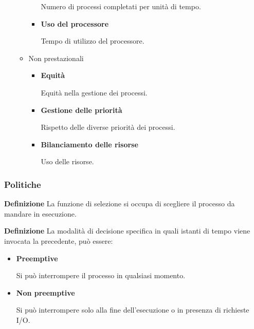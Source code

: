 \documentclass{article}
\begin{document}
\begin{itemize}
\begin{itemize}
\begin{itemize}
                        Numero di processi completati per unità di tempo.
                    
                    \item \textbf{Uso del processore}

                        Tempo di utilizzo del processore.

                    
                \end{itemize}
            
            \item Non prestazionali

                \begin{itemize}
                    \item \textbf{Equità}

                        Equità nella gestione dei processi.
                    
                    \item \textbf{Gestione delle priorità}

                        Rispetto delle diverse priorità dei processi.
                            
                    \item \textbf{Bilanciamento delle risorse}

                        Uso delle risorse.\newline
                    
                \end{itemize}
            
        \end{itemize}
    
\end{itemize}

\newpage

\subsubsection{Politiche}

\textbf{Definizione} La funzione di selezione si occupa di scegliere il processo da mandare in esecuzione.\newline

\noindent\textbf{Definizione} La modalità di decisione specifica in quali istanti di tempo viene invocata la precedente, può essere:
\begin{itemize}
    \item \textbf{Preemptive}

        Si può interrompere il processo in qualsiasi momento.
    
    \item \textbf{Non preemptive}

        Si può interrompere solo alla fine dell'esecuzione o in presenza di richieste I/O.\newline
        
\end{itemize}
\end{document}
